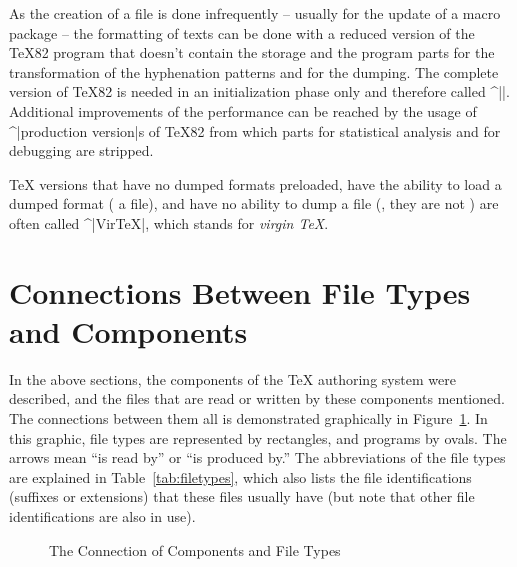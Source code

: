 As the creation of a \FMT{} file is done infrequently -- usually for
the update of a macro package -- the formatting of texts can be done
with a reduced version of the \TeX82 program that doesn't contain the
storage and the program parts for the transformation of the
hyphenation patterns and for the dumping. The complete version of
\TeX82 is needed in an initialization phase only and therefore called
^|\INITeX{}|. Additional improvements of the performance can be
reached  by the usage of ^|production version|s of \TeX82 from which
parts for statistical analysis and for debugging are stripped. 

\TeX{} versions that have no dumped formats preloaded, have the
ability to load a dumped format (\ie{} a \FMT{} file), and have no
ability to dump a \FMT{} file (\ie{}, they are not \INITeX{}) are
often called ^|Vir\TeX{}|, which stands for {\it virgin \TeX{}}.



\section{Connections Between File Types and Components}

In the above sections, the components of the \TeX{} authoring system 
were described, and the files that are read or written by these
components mentioned. The connections between them all is 
demonstrated graphically in Figure~\ref{fig:total}. In this graphic,
file types are represented by rectangles, and programs by ovals. The
arrows mean ``is read by'' or ``is produced by.'' The abbreviations
of the file types are explained in Table~\ref{tab:filetypes}, which
also lists the file identifications (suffixes or extensions) that
these files usually have (but note that  other file identifications
are also in use).

\begin{figure} 
\begin{center} 
 
\caption{The Connection of Components and File Types} 
\label{fig:total} 
\end{center}
\end{figure}

